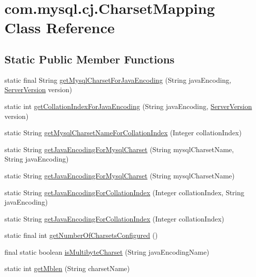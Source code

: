 \hypertarget{classcom_1_1mysql_1_1cj_1_1_charset_mapping}{}\section{com.\+mysql.\+cj.\+Charset\+Mapping Class Reference}
\label{classcom_1_1mysql_1_1cj_1_1_charset_mapping}
\subsection*{Static Public Member Functions}
\begin{DoxyCompactItemize}
\item 
static final String \mbox{\hyperlink{classcom_1_1mysql_1_1cj_1_1_charset_mapping_a45a0491159f7d586e8b73253f8a7d66f}{get\+Mysql\+Charset\+For\+Java\+Encoding}} (String java\+Encoding, \mbox{\hyperlink{classcom_1_1mysql_1_1cj_1_1_server_version}{Server\+Version}} version)
\item 
static int \mbox{\hyperlink{classcom_1_1mysql_1_1cj_1_1_charset_mapping_a1a1f492ed1ad7d1bf4209508f4b9df69}{get\+Collation\+Index\+For\+Java\+Encoding}} (String java\+Encoding, \mbox{\hyperlink{classcom_1_1mysql_1_1cj_1_1_server_version}{Server\+Version}} version)
\item 
static String \mbox{\hyperlink{classcom_1_1mysql_1_1cj_1_1_charset_mapping_abf5e68749ab0b4a9c5ee8259435ac614}{get\+Mysql\+Charset\+Name\+For\+Collation\+Index}} (Integer collation\+Index)
\item 
static String \mbox{\hyperlink{classcom_1_1mysql_1_1cj_1_1_charset_mapping_adcf497aaea2895c19f34687c266346e8}{get\+Java\+Encoding\+For\+Mysql\+Charset}} (String mysql\+Charset\+Name, String java\+Encoding)
\item 
static String \mbox{\hyperlink{classcom_1_1mysql_1_1cj_1_1_charset_mapping_a9c7e097901eb66aa023c4c0cf7638fca}{get\+Java\+Encoding\+For\+Mysql\+Charset}} (String mysql\+Charset\+Name)
\item 
static String \mbox{\hyperlink{classcom_1_1mysql_1_1cj_1_1_charset_mapping_a147550cb73d4a301fb41352263ccc6a2}{get\+Java\+Encoding\+For\+Collation\+Index}} (Integer collation\+Index, String java\+Encoding)
\item 
static String \mbox{\hyperlink{classcom_1_1mysql_1_1cj_1_1_charset_mapping_ab115c04c08a0186854fbff12ba9c6168}{get\+Java\+Encoding\+For\+Collation\+Index}} (Integer collation\+Index)
\item 
static final int \mbox{\hyperlink{classcom_1_1mysql_1_1cj_1_1_charset_mapping_a244f431cb6b92e6479a3b492723d8942}{get\+Number\+Of\+Charsets\+Configured}} ()
\item 
final static boolean \mbox{\hyperlink{classcom_1_1mysql_1_1cj_1_1_charset_mapping_a391d1057e001d901ed4a4b4170513f31}{is\+Multibyte\+Charset}} (String java\+Encoding\+Name)
\item 
static int \mbox{\hyperlink{classcom_1_1mysql_1_1cj_1_1_charset_mapping_af089a4b1c57135f56e6112fc1abdaeae}{get\+Mblen}} (String charset\+Name)
\end{DoxyCompactItemize}
